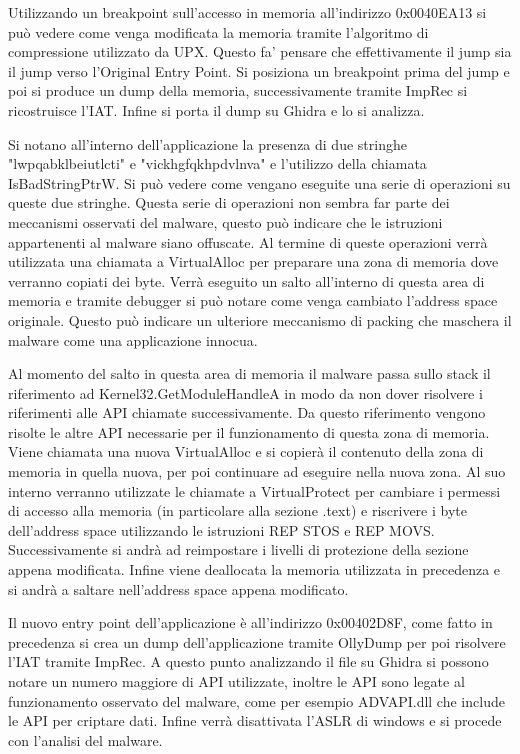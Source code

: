 \documentclass[a4paper,12pt]{article}
\begin{document}
Utilizzando un breakpoint sull'accesso in memoria all'indirizzo 0x0040EA13 si può vedere come venga modificata la memoria tramite l'algoritmo di compressione utilizzato da UPX. Questo fa' pensare che effettivamente il jump sia il jump verso l'Original Entry Point. Si posiziona un breakpoint prima del jump e poi si produce un dump della memoria, successivamente tramite ImpRec si ricostruisce l'IAT.
Infine si porta il dump su Ghidra e lo si analizza.

Si notano all'interno dell'applicazione la presenza di due stringhe "lwpqabklbeiutlcti" e "vickhgfqkhpdvlnva" e l'utilizzo della chiamata IsBadStringPtrW. Si può vedere come vengano eseguite una serie di operazioni su queste due stringhe. Questa serie di operazioni non sembra far parte dei meccanismi osservati del malware, questo può indicare che le istruzioni appartenenti al malware siano offuscate. 
Al termine di queste operazioni verrà utilizzata una chiamata a VirtualAlloc per preparare una zona di memoria dove verranno copiati dei byte.  Verrà eseguito un salto all'interno di questa area di memoria e tramite debugger si può notare come venga cambiato l'address space originale. Questo può indicare un ulteriore meccanismo di packing che maschera il malware come una applicazione innocua.

Al momento del salto in questa area di memoria il malware passa sullo stack il riferimento ad Kernel32.GetModuleHandleA in modo da non dover risolvere i riferimenti alle API chiamate successivamente. Da questo riferimento vengono risolte le altre API necessarie per il funzionamento di questa zona di memoria. Viene chiamata una nuova VirtualAlloc e si copierà il contenuto della zona di memoria in quella nuova, per poi continuare ad eseguire nella nuova zona. Al suo interno verranno utilizzate le chiamate a VirtualProtect per cambiare i permessi di accesso alla memoria (in particolare alla sezione .text) e riscrivere i byte dell'address space utilizzando le istruzioni REP STOS e REP MOVS. Successivamente si andrà ad reimpostare i livelli di protezione della sezione appena modificata. Infine viene deallocata la memoria utilizzata in precedenza e si andrà a saltare nell'address space appena modificato.

Il nuovo entry point dell'applicazione è all'indirizzo 0x00402D8F, come fatto in precedenza si crea un dump dell'applicazione tramite OllyDump per poi risolvere l'IAT tramite ImpRec. A questo punto analizzando il file su Ghidra si possono notare un numero maggiore di API utilizzate, inoltre le API sono legate al funzionamento osservato del malware, come per esempio ADVAPI.dll che include le API per criptare dati. Infine verrà disattivata l'ASLR di windows e si procede con l'analisi del malware. 
\end{document}
